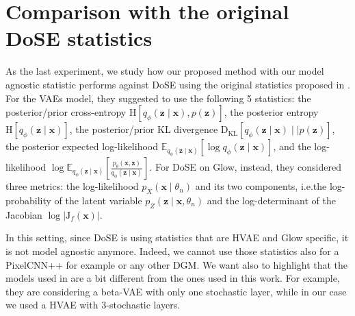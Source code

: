 {\section{Comparison with the original DoSE statistics}
As the last experiment, we study how our proposed method with our model agnostic statistic performs against DoSE using the original statistics proposed in \cite{morningstar_density_2021}. For the VAEs model, they suggested to use the following 5 statistics: the posterior/prior cross-entropy $\text{H}[q_{\phi}( \textbf{z}\mid \textbf{x}), p(\textbf{z})]$, the posterior entropy $\text{H}[q_{\phi}(\textbf{z}\mid \textbf{x})]$, the posterior/prior KL divergence $\text{D}_{\text{KL}}[q_{\phi}(\textbf{z}\mid \textbf{x}) \mid \mid p(\textbf{z})]$, the posterior expected log-likelihood $\mathbb{E}_{q_{\phi}(\textbf{z}\mid \textbf{x})}[\log q_{\phi}(\textbf{z}\mid \mathbf{x})]$, and the log-likelihood $\log \mathbb{E}_{q_{\phi}(\textbf{z}\mid \textbf{x})} \left[ \frac{p_{\theta}(\textbf{x}, \textbf{z})}{q_{\phi}(\textbf{z}\mid \textbf{x})}\right]$. For DoSE on Glow, instead, they considered three metrics: the log-likelihood $p_{X}(\textbf{x}\mid \theta_n)$ and its two components, i.e.\@ the log-probability of the latent variable $p_{Z}(\textbf{z}\mid \textbf{x}, \theta_n)$ and the log-determinant of the Jacobian $\log | \text{J}_{f}(\textbf{x})|$. 

In this setting, since DoSE is using statistics that are HVAE and Glow specific, it is not model agnostic anymore. Indeed, we cannot use those statistics also for a PixelCNN++ for example or any other DGM. We want also to highlight that the models used in \cite{morningstar_density_2021} are a bit different from the ones used in this work. For example, they are considering a beta-VAE with only one stochastic layer, while in our case we used a HVAE with 3-stochastic layers. 




}
